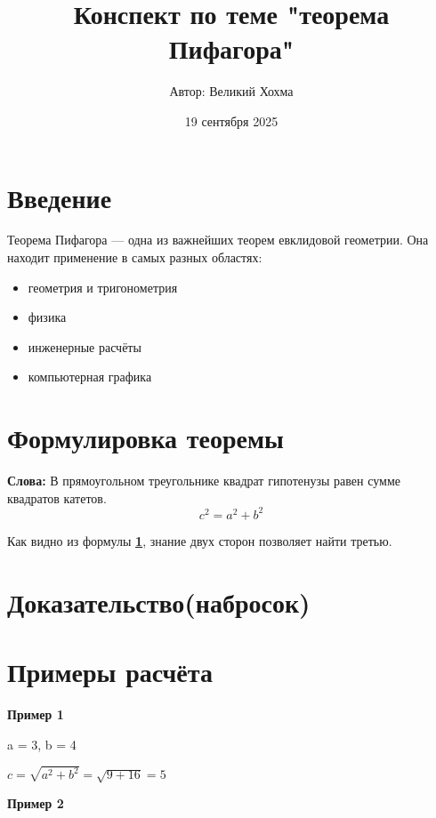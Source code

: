 \documentclass{article}
\title{Конспект по теме "теорема Пифагора"}
\author{Автор: Великий Хохма}
\date{19 сентября 2025}
\begin{document}
\maketitle


\tableofcontents
\newpage
\section{Введение}
Теорема Пифагора — одна из важнейших теорем евклидовой геометрии. Она находит
применение в самых разных областях:
\begin{itemize}
    \item геометрия и тригонометрия
    \item физика
    \item инженерные расчёты
    \item компьютерная графика
\end{itemize}

\section{Формулировка теоремы}
\textbf{Слова:}
В прямоугольном треугольнике квадрат гипотенузы равен сумме квадратов
катетов.
\begin{equation}\label{eq:pythago}
c^2 = a^2 + b^2
\end{equation}
\begin{center}

  \text Как видно из формулы \hyperlink{important}{\textbf{1}}, знание двух сторон позволяет найти третью.
\end{center}

\section{Доказательство(набросок)}
\begin{center}
\end{center}

\section{Примеры расчёта}
\hypertarget{important}{\textbf{Пример 1}}

\begin{center}

  \text a = 3, b = 4


  \text $ c = \sqrt{a^2 + b^2} = \sqrt{9 + 16} = 5$
\end{center}
\textbf{Пример 2}
\end{document}

